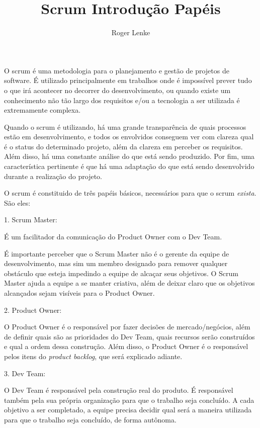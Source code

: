 \documentclass[12pt]{article}
\begin{document}
\title{%
Scrum}


\author{Roger Lenke}
\maketitle

\title{%
\large Introdução}\hfill \break

O scrum é uma metodologia para o planejamento e gestão de projetos de software. É utilizado principalmente em trabalhos onde é impossível prever tudo o que irá acontecer no decorrer do desenvolvimento, ou quando existe um conhecimento não tão largo dos requisitos e/ou a tecnologia a ser utilizada é extremamente complexa.\hfill \break

Quando o scrum é utilizando, há uma grande transparência de quais processos estão em desenvolvimento, e todos os envolvidos conseguem ver com clareza qual é o status do determinado projeto, além da clareza em perceber os requisitos. Além disso, há uma constante análise do que está sendo produzido. Por fim, uma característica pertinente é que há uma adaptação do que está sendo desenvolvido durante a realização do projeto.\hfill \break

\title{%
\large Papéis}\hfill \break
O scrum é constituido de três papéis básicos, necessários para que o scrum \emph{exista}. São eles: \hfill \break

1. Scrum Master:\hfill \break

É um facilitador da comunicação do Product Owner com o Dev Team. \hfill \break

É importante perceber que o Scrum Master não é o gerente da equipe de desenvolvimento, mas sim um membro designado para remover qualquer obstáculo que esteja impedindo a equipe de alcaçar seus objetivos. O Scrum Master ajuda a equipe a se manter criativa, além de deixar claro que os objetivos alcançados sejam visíveis para o Product Owner.\hfill \break

2. Product Owner:\hfill \break

O Product Owner é o responsável por fazer decisões de mercado/negócios, além de definir quais são as prioridades do Dev Team, quais recursos serão construídos e qual a ordem dessa construção. Além disso, o Product Owner é o responsável pelos itens do \emph{product backlog}, que será explicado adiante.\hfill \break

3. Dev Team:\hfill \break

O Dev Team é responsável pela construção real do produto. É responsável também pela sua própria organização para que o trabalho seja concluído. A cada objetivo a ser completado, a equipe precisa decidir qual será a maneira utilizada para que o trabalho seja concluído, de forma autônoma. \hfill \break
\end{document}
